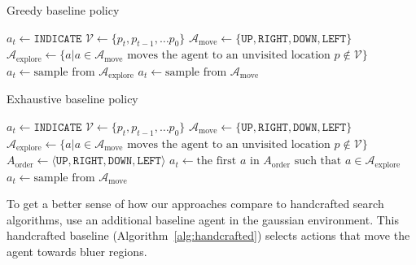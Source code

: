 \begin{algorithm}
    \caption{Greedy baseline policy}
    \label{alg:greedy}
    \begin{algorithmic}
            \State \(a_t \leftarrow \mathtt{INDICATE}\)
        \Else
            \State \(\mathcal{V} \leftarrow \{p_t, p_{t-1}, \dots p_0\}\)
            \State \(\mathcal{A}_{\text{move}} \leftarrow \{\mathtt{UP}, \mathtt{RIGHT}, \mathtt{DOWN}, \mathtt{LEFT}\}\)
            \State \(\mathcal{A}_{\text{explore}} \leftarrow \{a | a \in \mathcal{A}_{\text{move}} \text{ moves the agent to an unvisited location } p \notin \mathcal{V}\}\) 
                \State \(a_t \leftarrow \text{sample from } \mathcal{A}_{\text{explore}}\)
            \Else
                \State \(a_t \leftarrow \text{sample from } \mathcal{A}_{\text{move}}\)
            \EndIf
        \EndIf
    \end{algorithmic}
\end{algorithm}

\begin{algorithm}
    \caption{Exhaustive baseline policy}
    \label{alg:exhaustive}
    \begin{algorithmic}
            \State \(a_t \leftarrow \mathtt{INDICATE}\)
        \Else
            \State \(\mathcal{V} \leftarrow \{p_t, p_{t-1}, \dots p_0\}\)
            \State \(\mathcal{A}_{\text{move}} \leftarrow \{\mathtt{UP}, \mathtt{RIGHT}, \mathtt{DOWN}, \mathtt{LEFT}\}\)
            \State \(\mathcal{A}_{\text{explore}} \leftarrow \{a | a \in \mathcal{A}_{\text{move}} \text{ moves the agent to an unvisited location } p \notin \mathcal{V}\}\) 
                \State \(A_{\text{order}} \leftarrow \langle \mathtt{UP}, \mathtt{RIGHT}, \mathtt{DOWN}, \mathtt{LEFT} \rangle\)
                \State \(a_t \leftarrow \text{the first } a \text{ in } A_{\text{order}} \text{ such that } a \in \mathcal{A}_{\text{explore}}\)
            \Else
                \State \(a_t \leftarrow \text{sample from } \mathcal{A}_{\text{move}}\)
            \EndIf
        \EndIf
    \end{algorithmic}
\end{algorithm}


To get a better sense of how our approaches compare to handcrafted search algorithms, use an additional baseline agent in the gaussian environment.
This handcrafted baseline (Algorithm~\ref{alg:handcrafted}) selects actions that move the agent towards bluer regions.

